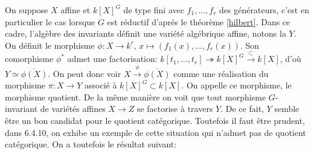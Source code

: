 On suppose $X$ affine et $k[X]^G$ de type fini avec $f_1,...,f_r$ des générateurs, c'est en particulier le cas lorsque $G$ est réductif d'aprés le théorème \ref{hilbert}. Dans ce cadre, l'algèbre des invariants définit une variété algébrique affine, notons la $Y$. On définit le morphisme $\phi :X\rightarrow k^r,\, x\mapsto (f_1(x),...,f_r(x))$. Son comorphisme $\phi^*$ admet une factorisation: $k[t_1,...,t_r]\twoheadrightarrow k[X]^G\xrightarrow{\subset}k[X]$, d'où $Y\simeq \overline{\phi (X)}$. On peut donc voir $X \xrightarrow{\phi} \overline{\phi (X)}$ comme une réalisation du morphisme $\pi: X\rightarrow Y$ associé à $k[X]^G\subset k[X]$. On appelle ce morphisme, le morphisme quotient. De la même manière on voit que tout morphisme $G$-invariant de variétés affines $X\rightarrow Z$ se factorise à travers $Y$. De ce fait, $Y$ semble être un bon candidat pour le quotient catégorique. Toutefois il faut être prudent, dans \cite{LAGFerrer} 6.4.10, on exhibe un exemple de cette situation qui n'admet pas de quotient catégorique. On a toutefois le résultat suivant:

